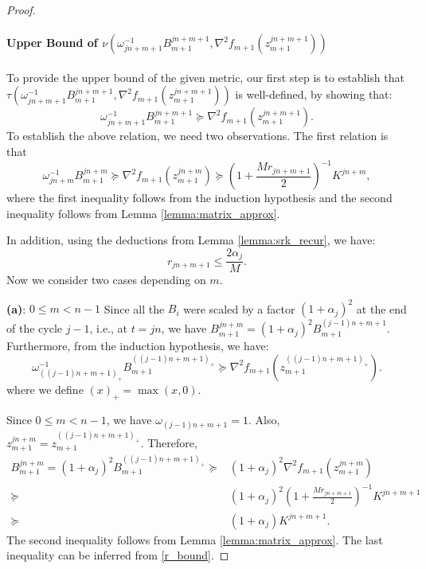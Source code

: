 \begin{proof}
    \paragraph{Upper Bound of $\nu(\omega_{j n + m + 1}^{-1} B_{m + 1}^{j n + m + 1}, \nabla^2 f_{m + 1} (z_{m+1}^{j n + m + 1}))$}
    To provide the upper bound of the given metric, our first step is  to establish that $\tau(\omega_{j n + m + 1}^{-1} B_{m + 1}^{j n + m + 1}, \nabla^2 f_{m + 1} (z_{m+1}^{j n + m + 1}))$ is well-defined, by showing that:
    \begin{equation}
        \omega_{j n + m + 1}^{-1} B_{m + 1}^{j n + m + 1} \succeq \nabla^2 f_{m + 1} (z_{m+1}^{j n + m + 1}).
        \label{eq:valid_metric}
    \end{equation}
    To establish the above relation, we need two observations. The first relation is that 
    \begin{equation*}
        \omega_{j n + m}^{-1} B_{m + 1}^{j n + m} \succeq \nabla^2 f_{m+1}(z_{m+1}^{j n + m}) \succeq \left(1 + \frac{M r_{j n + m + 1}}{2}\right)^{-1} K^{j n + m}, 
    \end{equation*}
    where the first inequality follows from the induction hypothesis and the second inequality follows from Lemma \ref{lemma:matrix_approx}.

    In addition, using the deductions from Lemma \ref{lemma:srk_recur}, we have:
    \begin{equation}
        r_{j n + m + 1} \leq \frac{2 \alpha_j}{M}.
        \label{r_bound}
    \end{equation}
    Now we consider two cases depending on $m$.

    \textbf{(a)}: $0 \leq m < n - 1$
    Since all the $B_i$ were scaled by a factor $(1 + \alpha_j)^2$ at the end of the cycle $j - 1$, i.e., at $t = j n$, we have $B_{m+1}^{j n + m} = (1 + \alpha_j)^2 B_{m+1}^{(j - 1) n + m + 1}$. Furthermore, from the induction hypothesis, we have:
    \begin{equation*}
        \omega_{((j - 1)n + m + 1)_{+}}^{-1} B_{m+1}^{((j - 1) n + m + 1)_{+}} \succeq \nabla^2 f_{m+1}(z_{m+1}^{((j - 1)n + m + 1)_{+}}).
    \end{equation*}
    where we define $(x)_{+} = \max(x, 0)$.

    Since $0 \leq m < n - 1$, we have $\omega_{(j - 1)n + m + 1} = 1$. Also, $z_{m+1}^{j n + m} = z_{m+1}^{((j - 1)n + m + 1)_{+}}$. Therefore,
    \begin{align*}
        B_{m+1}^{j n + m} = (1 + \alpha_j)^2 B_{m+1}^{((j - 1)n + m + 1)_{+}} \succeq & (1 + \alpha_j)^2 \nabla^2 f_{m+1}(z_{m+1}^{j n + m}) \\
        \succeq & (1 + \alpha_j)^2 \left(1 + \frac{M r_{j n + m + 1}}{2}\right)^{-1} K^{j n + m + 1} \\
        \succeq & (1 + \alpha_j) K^{j n + m + 1}.
    \end{align*}
    The second inequality follows from Lemma \ref{lemma:matrix_approx}. The last inequality can be inferred from \eqref{r_bound}.


\end{proof}
